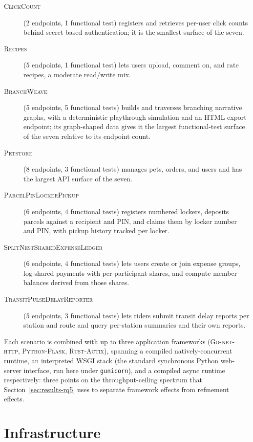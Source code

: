 \begin{description}
  \item[\normalfont\textsc{ClickCount}] (2 endpoints, 1 functional test) registers and
    retrieves per-user click counts behind secret-based authentication; it
    is the smallest surface of the seven.
  \item[\normalfont\textsc{Recipes}] (5 endpoints, 1 functional test) lets users
    upload, comment on, and rate recipes, a moderate read/write mix.
  \item[\normalfont\textsc{BranchWeave}] (5 endpoints, 5 functional tests) builds and
    traverses branching narrative graphs, with a deterministic playthrough
    simulation and an HTML export endpoint; its graph-shaped data gives it
    the largest functional-test surface of the seven relative to its
    endpoint count.
  \item[\normalfont\textsc{Petstore}] (8 endpoints, 3 functional tests) manages pets,
    orders, and users and has the largest API surface of the seven.
  \item[\normalfont\textsc{ParcelPinLockerPickup}] (6 endpoints, 4 functional tests)
    registers numbered lockers, deposits parcels against a recipient and
    PIN, and claims them by locker number and PIN, with pickup history
    tracked per locker.
  \item[\normalfont\textsc{SplitNestSharedExpenseLedger}] (6 endpoints, 4 functional
    tests) lets users create or join expense groups, log shared payments
    with per-participant shares, and compute member balances derived from
    those shares.
  \item[\normalfont\textsc{TransitPulseDelayReporter}] (5 endpoints, 3 functional
    tests) lets riders submit transit delay reports per station and route
    and query per-station summaries and their own reports.
\end{description}

Each scenario is combined with up to three application frameworks
(\textsc{Go-net-http}, \textsc{Python-Flask}, \textsc{Rust-Actix}), spanning
a compiled natively-concurrent runtime, an interpreted WSGI stack (the
standard synchronous Python web-server interface, run here under
\texttt{gunicorn}), and a compiled async runtime respectively: three points
on the throughput-ceiling spectrum that Section~\ref{sec:results-rq5} uses
to separate framework effects from refinement effects.


\section{Infrastructure}
\label{sec:setup-infrastructure}

